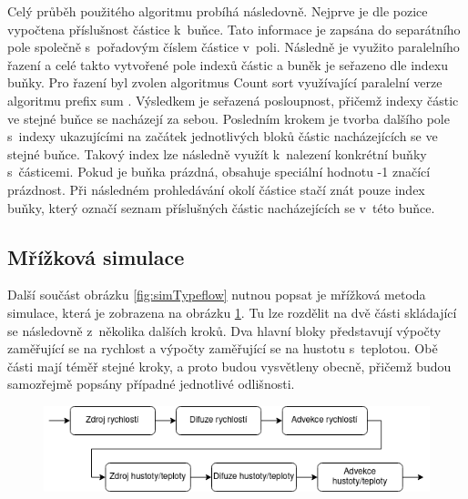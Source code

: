 Celý průběh použitého algoritmu probíhá následovně. Nejprve je dle pozice vypočtena příslušnost částice k~buňce. Tato informace je zapsána do separátního pole společně s~pořadovým číslem částice v~poli. Následně je využito paralelního řazení a celé takto vytvořené pole indexů částic a buněk je seřazeno dle indexu buňky. Pro řazení byl zvolen algoritmus Count sort \cite{CountSortGPU} využívající paralelní verze algoritmu prefix sum \cite{GPUGemsPrefixSum}. Výsledkem je seřazená posloupnost, přičemž indexy částic ve stejné buňce se nacházejí za sebou. Posledním krokem je tvorba dalšího pole s~indexy ukazujícími na začátek jednotlivých bloků částic nacházejících se ve stejné buňce. Takový index lze následně využít k~nalezení konkrétní buňky s~částicemi. Pokud je buňka prázdná, obsahuje speciální hodnotu -1 značící prázdnost. Při následném prohledávání okolí částice stačí znát pouze index buňky, který označí seznam příslušných částic nacházejících se v~této buňce.

\subsection{Mřížková simulace}
\label{chapter:simGrid}
Další součást obrázku \ref{fig:simTypeflow} nutnou popsat je mřížková metoda simulace, která je zobrazena na obrázku \ref{fig:Gridflow}. Tu lze rozdělit na dvě části skládající se následovně z~několika dalších kroků. Dva hlavní bloky představují výpočty zaměřující se na rychlost a výpočty zaměřující se na hustotu s~teplotou. Obě části mají téměř stejné kroky, a proto budou vysvětleny obecně, přičemž budou samozřejmě popsány případné jednotlivé odlišnosti.

\begin{figure}[hbt]
	\centering
	\captionsetup{justification=centering}
	\includegraphics[scale=0.6]{obrazky-figures/GridFluid.png}
	\label{fig:Gridflow}
\end{figure}

